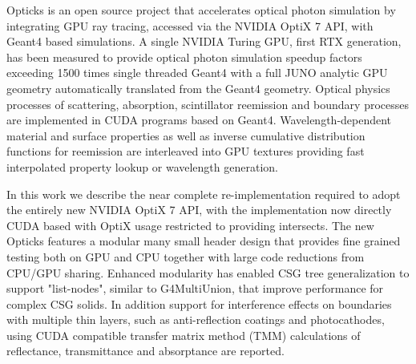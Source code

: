 Opticks is an open source project that accelerates optical photon simulation  
by integrating GPU ray tracing, accessed via the NVIDIA OptiX 7 API, with 
Geant4 based simulations. 
A single NVIDIA Turing GPU, first RTX generation, has been measured to provide optical 
photon simulation speedup factors exceeding 1500 times single threaded Geant4 
with a full JUNO analytic GPU geometry automatically translated from the Geant4 geometry.
%
Optical physics processes of scattering, absorption, scintillator reemission and 
boundary processes are implemented in CUDA programs based on Geant4.
Wavelength-dependent material and surface properties as well as  
inverse cumulative distribution functions for reemission are interleaved into 
GPU textures providing fast interpolated property lookup or wavelength generation.
%

In this work we describe the near complete re-implementation required to adopt 
the entirely new NVIDIA OptiX 7 API, with the implementation now directly CUDA 
based with OptiX usage restricted to providing intersects.  
The new Opticks features a modular many small header
design that provides fine grained testing both on GPU and CPU 
together with large code reductions from CPU/GPU sharing.  
Enhanced modularity has enabled CSG tree generalization to support "list-nodes", 
similar to G4MultiUnion, that improve performance for complex CSG solids.  
In addition support for interference effects on boundaries with multiple thin layers,
such as anti-reflection coatings and photocathodes, using CUDA compatible
transfer matrix method (TMM) calculations of reflectance, transmittance and
absorptance are reported.
